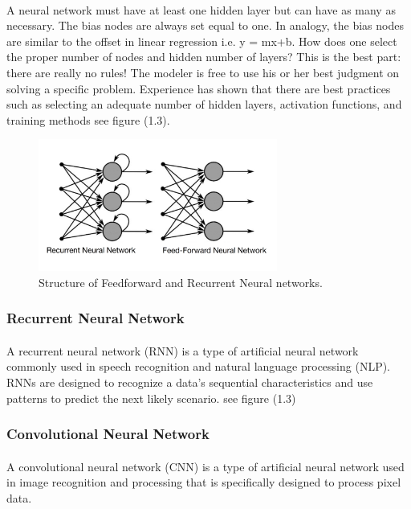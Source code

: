 \paragraph{}A neural network must have at least one hidden layer but can have as many as necessary. The bias nodes are always set equal to one. In analogy, the bias nodes are similar to the offset in linear regression 
i.e. y = mx+b. How does one select the proper number of nodes and hidden number of layers? This is the best part: there are really no rules! The modeler is free to use his or her best judgment on solving a specific problem. Experience has shown that there are best practices such as selecting an adequate number of hidden layers, activation functions, and training methods
see figure (1.3).
\begin{figure}
	\centering
	\includegraphics[width=0.7\textwidth]{rf.png}
	\caption{Structure of Feedforward and Recurrent Neural networks.}
\end{figure}
\subsubsection{Recurrent Neural Network
}
\paragraph{}
A recurrent neural network (RNN) is a type of artificial neural network commonly used in speech recognition and natural language processing (NLP). RNNs are designed to recognize a data's sequential characteristics and use patterns to predict the next likely scenario. see figure (1.3) 
\subsubsection{Convolutional Neural Network
}
\paragraph{}
A convolutional neural network (CNN) is a type of artificial neural network used in image recognition and processing that is specifically designed to process pixel data.

